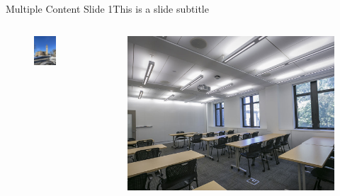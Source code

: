 \documentclass[usenames,dvipsnames]{beamer}
\begin{document}
\begin{frame}{Multiple Content Slide 1}{This is a slide subtitle}
    \begin{columns}
        \begin{column}{0.35\textwidth}
            \begin{figure}
                \centering
                \includegraphics[width=\linewidth]{Images/McGraw_Tower_in_January.JPG}
            \end{figure} 
        \end{column} 
        \begin{column}{0.65\textwidth} \scriptsize 
            \begin{figure}
                \centering
                \includegraphics[width=.57\linewidth]{Images/carousel-04.jpg}

\end{figure}
\end{column}
\end{columns}
\end{frame}
\end{document}
